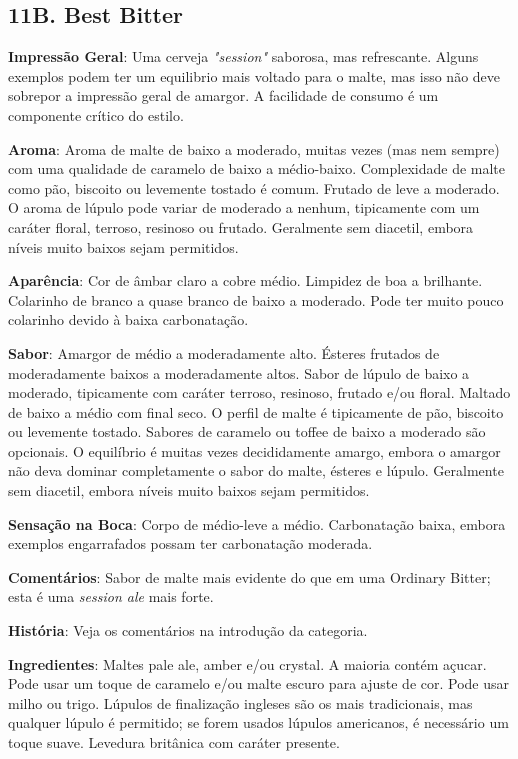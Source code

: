 \subsection*{11B. Best Bitter}
\textbf{Impressão Geral}: Uma cerveja \textit{"session"} saborosa, mas refrescante. Alguns exemplos podem ter um equilibrio mais voltado para o malte, mas isso não deve sobrepor a impressão geral de amargor. A facilidade de consumo é um componente crítico do estilo.

\textbf{Aroma}: Aroma de malte de baixo a moderado, muitas vezes (mas nem sempre) com uma qualidade de caramelo de baixo a médio-baixo. Complexidade de malte como pão, biscoito ou levemente tostado é comum. Frutado de leve a moderado. O aroma de lúpulo pode variar de moderado a nenhum, tipicamente com um caráter floral, terroso, resinoso ou frutado. Geralmente sem diacetil, embora níveis muito baixos sejam permitidos.

\textbf{Aparência}: Cor de âmbar claro a cobre médio. Limpidez de boa a brilhante. Colarinho de branco a quase branco de baixo a moderado. Pode ter muito pouco colarinho devido à baixa carbonatação.

\textbf{Sabor}: Amargor de médio a moderadamente alto. Ésteres frutados de moderadamente baixos a moderadamente altos. Sabor de lúpulo de baixo a moderado, tipicamente com caráter terroso, resinoso, frutado e/ou floral. Maltado de baixo a médio com final seco. O perfil de malte é tipicamente de pão, biscoito ou levemente tostado. Sabores de caramelo ou toffee de baixo a moderado são opcionais. O equilíbrio é muitas vezes decididamente amargo, embora o amargor não deva dominar completamente o sabor do malte, ésteres e lúpulo. Geralmente sem diacetil, embora níveis muito baixos sejam permitidos.

\textbf{Sensação na Boca}: Corpo de médio-leve a médio. Carbonatação baixa, embora exemplos engarrafados possam ter carbonatação moderada.

\textbf{Comentários}: Sabor de malte mais evidente do que em uma Ordinary Bitter; esta é uma \textit{session ale} mais forte.

\textbf{História}: Veja os comentários na introdução da categoria.

\textbf{Ingredientes}: Maltes pale ale, amber e/ou crystal. A maioria contém açucar. Pode usar um toque de caramelo e/ou malte escuro para ajuste de cor. Pode usar milho ou trigo. Lúpulos de finalização ingleses são os mais tradicionais, mas qualquer lúpulo é permitido; se forem usados lúpulos americanos, é necessário um toque suave. Levedura britânica com caráter presente.


